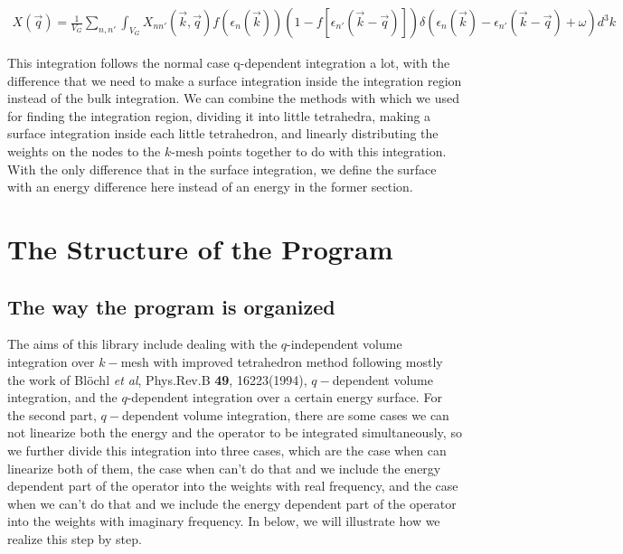 \documentclass[10pt]{article}
\begin{document}
\begin{eqnarray}\label{qdepsurf}
X(\vec{q})=\frac{1}{V_G}\sum\limits_{n,n'}\int_{V_G}X_{nn'}(\vec{k},\vec{q})f(\epsilon_{n}(\vec{k}))(1-f[\epsilon_{n'}(\vec{k}-\vec{q})])\delta(\epsilon_{n}(\vec{k})-\epsilon_{n'}(\vec{k}-\vec{q})+\omega)d^3k
\end{eqnarray}

This integration follows the normal case q-dependent integration a lot, with the difference that we need to make a surface integration inside the integration region instead of the bulk integration. We can combine the methods with which we used for finding the integration region, dividing it into little tetrahedra, making a surface integration inside each little tetrahedron, and linearly distributing the weights on the nodes to the $k$-mesh points together to do with this integration. With the only difference that in the surface integration, we define the surface with an energy difference here instead of an energy in the former section.


\newpage
\section{The Structure of the Program}


\subsection{The way the program is organized}


The aims of this library include dealing with the $q$-independent volume integration over $k-$mesh with improved tetrahedron method following mostly the work of Bl{\"o}chl \textit{et al}, Phys.Rev.B \textbf{49}, 16223(1994), $q-$dependent volume integration, and the $q$-dependent integration over a certain energy surface. For the second part, $q-$dependent volume integration, there are some cases we can not linearize both the energy and the operator to be integrated simultaneously, so we further divide this integration into three cases, which are the case when can linearize both of them, the case when can't do that and we include the energy dependent part of the operator into the weights with real frequency, and the case when we can't do that and we include the energy dependent part of the operator into the weights with imaginary frequency. In below, we will illustrate how we realize this step by step.\\
\end{document}
